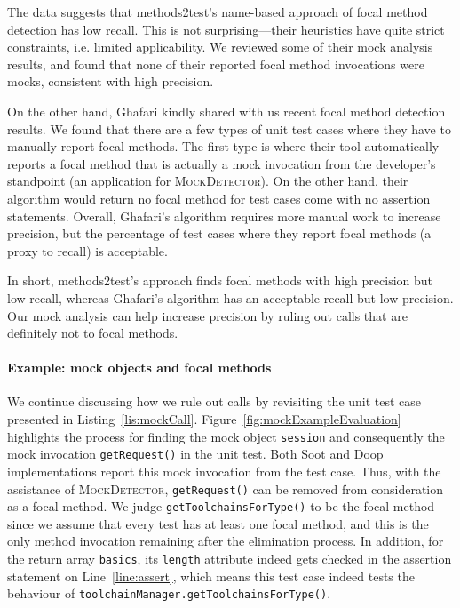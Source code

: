 The data suggests that methods2test's name-based approach of focal method detection has low recall. This is not surprising---their heuristics have quite strict constraints, i.e. limited applicability. We reviewed some of their mock analysis results, and found that none of their reported focal method invocations were mocks, consistent with high precision.

On the other hand, Ghafari kindly shared with us recent focal method detection results. We found that there are a few types of unit test cases where they have to manually report focal methods. The first type is where their tool automatically reports a focal method that is actually a mock invocation from the developer's standpoint (an application for \textsc{MockDetector}). On the other hand, their algorithm would return no focal method for test cases come with no assertion statements. Overall, Ghafari's algorithm requires more manual work to increase precision, but the percentage of test cases where they report focal methods (a proxy to recall) is acceptable. 

In short, methods2test's approach finds focal methods with high precision but low recall, whereas Ghafari's algorithm has an acceptable recall but low precision. Our mock analysis can help increase precision by ruling out calls that are definitely not to focal methods.

\paragraph{Example: mock objects and focal methods} We continue discussing how we rule out calls by revisiting the unit test case presented in Listing~\ref{lis:mockCall}. Figure~\ref{fig:mockExampleEvaluation} highlights the process for finding the mock object \texttt{session} and consequently the mock invocation \texttt{getRequest()} in the unit test. Both Soot and Doop implementations report this mock invocation 
from the test case. Thus, with the assistance of \textsc{MockDetector}, \texttt{getRequest()} can be removed from consideration as a focal method. We judge \texttt{getToolchainsForType()} to be the focal method since we assume that every test has at least one focal method, and this is the only method invocation remaining after the elimination process. In addition, for the return array \texttt{basics}, its \texttt{length} attribute indeed gets checked in the assertion statement on Line~\ref{line:assert}, which means this test case indeed tests the behaviour of \texttt{toolchainManager.getToolchainsForType()}. 

